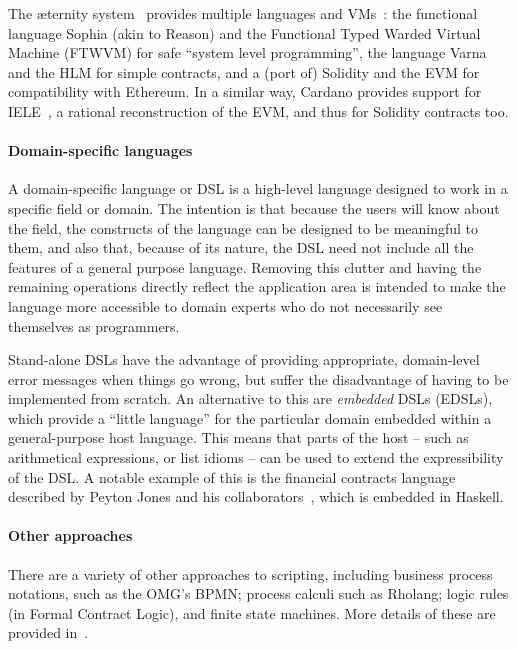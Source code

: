 \documentclass[runningheads]{llncs}
\begin{document}
The \ae{}ternity system~\cite{aeternity} provides multiple languages and VMs~\cite{Stenman-CODE-BEAM}: the functional language  Sophia (akin to 
Reason) and the Functional Typed Warded Virtual Machine (FTWVM) for safe ``system level programming'', the language 
Varna and the HLM for simple contracts, and a (port of) Solidity and the EVM for compatibility with Ethereum. In a 
similar way, Cardano provides support for IELE~\cite{IELE}, a rational reconstruction of the EVM, and thus for Solidity 
contracts too. 

\paragraph{Domain-specific languages} 

A domain-specific language or DSL is a high-level language designed to work in a specific field or domain. The intention 
is that because the users will know about the field, the constructs of the language can be designed to be meaningful to 
them, and also that, because of its nature, the DSL need not include all the features of a general purpose language. 
Removing this clutter and having the remaining operations directly reflect the application area is intended to make the 
language more accessible to domain experts who do not necessarily see themselves as programmers.

Stand-alone DSLs have the advantage of providing appropriate, domain-level error messages when things go wrong, but 
suffer the disadvantage of having to be implemented from scratch. An alternative to this are \emph{embedded} DSLs 
(EDSLs), which provide a ``little language'' for the particular domain embedded within a general-purpose host language. 
This means that parts of the host -- such as arithmetical expressions, or list idioms --  can be used to extend the 
expressibility of the DSL. A notable example of this is the financial contracts language described by Peyton Jones and 
his collaborators~\cite{PeytonJones:2000}, which is embedded in Haskell.

\paragraph{Other approaches}

There are a variety of other approaches to scripting, including business process notations, such as the OMG's BPMN; 
process calculi such as Rholang; logic rules (in Formal Contract Logic), and finite state machines. More details of 
these are provided in~\cite{cryptoeprint:2016:1156}.
\end{document}
